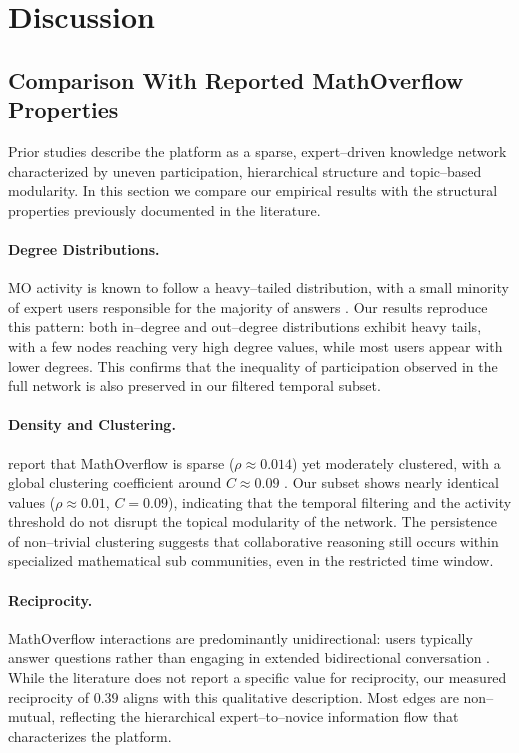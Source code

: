 \documentclass[sigplan]{acmart}
\begin{document}
\section{Discussion}\label{sec:discussion}
    \subsection{Comparison With Reported MathOverflow Properties}
        Prior studies describe the platform as a sparse, expert–driven knowledge network characterized by uneven participation, hierarchical structure and topic–based modularity. In this section we compare our empirical results with the structural properties previously documented in the literature.
        
        \paragraph{Degree Distributions.}
            MO activity is known to follow a heavy–tailed distribution, with a small minority of expert users responsible for the majority of answers \cite{participation2013}. Our results reproduce this pattern: both in–degree and out–degree distributions exhibit heavy tails, with a few nodes reaching very high degree values, while most users appear with lower degrees. This confirms that the inequality of participation observed in the full network is also preserved in our filtered temporal subset.
        
        \paragraph{Density and Clustering.}
            \citeauthor{socialMathoveflow2013} report that MathOverflow is sparse ($\rho \approx 0.014$) yet moderately clustered, with a global clustering coefficient around $C \approx 0.09$ \cite{socialMathoveflow2013}. Our subset shows nearly identical values ($\rho \approx 0.01$, $C = 0.09$), indicating that the temporal filtering and the activity threshold do not disrupt the topical modularity of the network. The persistence of non–trivial clustering suggests that collaborative reasoning still occurs within specialized mathematical sub communities, even in the restricted time window.
               
        \paragraph{Reciprocity.}
            MathOverflow interactions are predominantly unidirectional: users typically answer questions rather than engaging in extended bidirectional conversation \cite{participation2013}. While the literature does not report a specific value for reciprocity, our measured reciprocity of $0.39$ aligns with this qualitative description. Most edges are non–mutual, reflecting the hierarchical expert–to–novice information flow that characterizes the platform.
        
\end{document}
